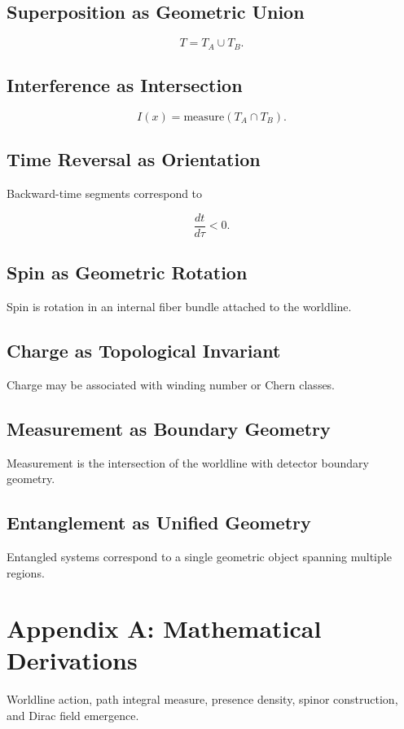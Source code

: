\documentclass[12pt]{article}
\begin{document}
\subsection{Superposition as Geometric Union}


\[
T = T_A \cup T_B.
\]



\subsection{Interference as Intersection}


\[
I(x) = \text{measure}(T_A \cap T_B).
\]



\subsection{Time Reversal as Orientation}
Backward-time segments correspond to


\[
\frac{dt}{d\tau} < 0.
\]



\subsection{Spin as Geometric Rotation}
Spin is rotation in an internal fiber bundle attached to the worldline.

\subsection{Charge as Topological Invariant}
Charge may be associated with winding number or Chern classes.

\subsection{Measurement as Boundary Geometry}
Measurement is the intersection of the worldline with detector boundary geometry.

\subsection{Entanglement as Unified Geometry}
Entangled systems correspond to a single geometric object spanning multiple regions.

\section*{Appendix A: Mathematical Derivations}
Worldline action, path integral measure, presence density, spinor construction, and Dirac field emergence.
\end{document}
